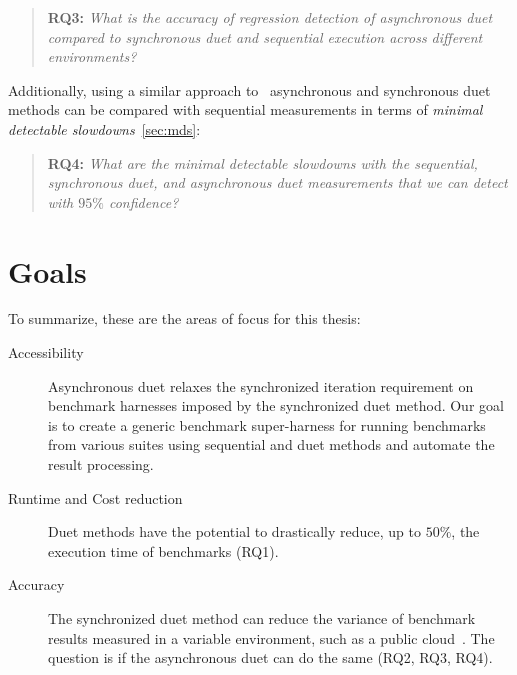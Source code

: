 \begin{quote}
	\textbf{RQ3:} \emph{What is the accuracy of regression detection of asynchronous duet compared to synchronous duet and sequential execution across different environments?}
\end{quote}

Additionally, using a similar approach to~\citet{laaber2019software} asynchronous and synchronous duet methods can be compared with sequential measurements in terms of \emph{minimal detectable slowdowns}~\cref{sec:mds}:

\begin{quote}
	\textbf{RQ4:} \emph{What are the minimal detectable slowdowns with the sequential, synchronous duet, and asynchronous duet measurements that we can detect with $95\%$ confidence?}
\end{quote}

\section{Goals}
\label{sec:goals}

To summarize, these are the areas of focus for this thesis:
\begin{description}
	\item[Accessibility]
		Asynchronous duet relaxes the synchronized iteration requirement on benchmark harnesses imposed by the synchronized duet method.
		Our goal is to create a generic benchmark super-harness for running benchmarks from various suites using sequential and duet methods and automate the result processing.
	\item[Runtime and Cost reduction]
		Duet methods have the potential to drastically reduce, up to $50\%$, the execution time of benchmarks (RQ1).
	\item[Accuracy]
		The synchronized duet method can reduce the variance of benchmark results measured in a variable environment, such as a public cloud~\cite{bulej2020duet}.
		The question is if the asynchronous duet can do the same (RQ2, RQ3, RQ4).
\end{description}
